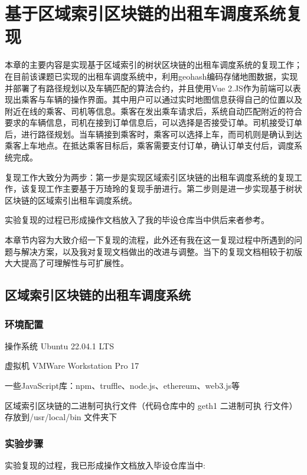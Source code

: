 
\chapter{基于区域索引区块链的出租车调度系统复现}
本章的主要内容是实现基于区域索引的树状区块链的出租车调度系统的复现工作；在目前该课题已实现的出租车调度系统中，利用geohash编码存储地图数据，实现并部署了有路径规划以及车辆匹配的算法合约，并且使用Vue 2.JS作为前端可以表现出乘客与车辆的操作界面。其中用户可以通过实时地图信息获得自己的位置以及附近在线的乘客、司机等信息。乘客在发出乘车请求后，系统自动匹配附近的符合要求的车辆信息，司机在接到订单信息后，可以选择是否接受订单。司机接受订单后，进行路径规划。当车辆接到乘客时，乘客可以选择上车，而司机则是确认到达乘客上车地点。在抵达乘客目标后，乘客需要支付订单，确认订单支付后，调度系统完成。

复现工作大致分为两步：第一步是实现区域索引区块链的出租车调度系统的复现工作，该复现工作主要基于万琦玲的复现手册进行。第二步则是进一步实现基于树状区块链的区域索引出租车调度系统。

实验复现的过程已形成操作文档放入了我的毕设仓库当中供后来者参考。
 
本章节内容为大致介绍一下复现的流程，此外还有我在这一复现过程中所遇到的问题与解决方案，以及我对复现文档做出的改进与调整。当下的复现文档相较于初版大大提高了可理解性与可扩展性。

\section{区域索引区块链的出租车调度系统}

\subsection{环境配置}

操作系统 Ubuntu 22.04.1 LTS

虚拟机 VMWare Workstation Pro 17
	
一些JavaScript库：npm、truffle、node.js、ethereum、web3.js等 

区域索引区块链的二进制可执行文件（代码仓库中的 geth1 二进制可执
行文件）存放到/usr/local/bin 文件夹下

\subsection{实验步骤}

实验复现的过程，我已形成操作文档放入毕设仓库当中:

